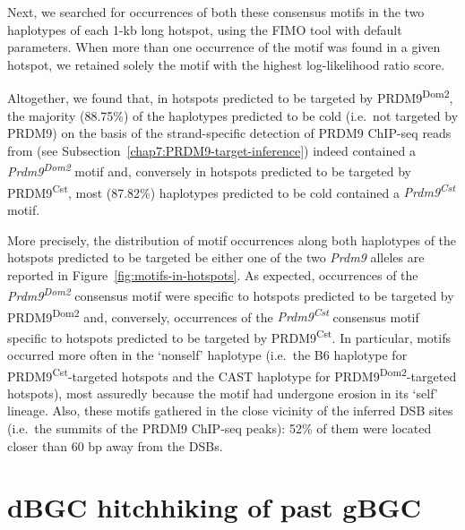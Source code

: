 Next, we searched for occurrences of both these consensus motifs in the two haplotypes of each 1-kb long hotspot, using the FIMO tool \citep{grant2011fimo} with default parameters. 
When more than one occurrence of the motif was found in a given hotspot, we retained solely the motif with the highest log-likelihood ratio score.

Altogether, we found that, in hotspots predicted to be targeted by PRDM9\textsuperscript{Dom2}, the majority (88.75\%) of the haplotypes predicted to be cold (i.e.\ not targeted by PRDM9) on the basis of the strand-specific detection of PRDM9 ChIP-seq reads from \citet{baker2015prdm9} (see Subsection~\ref{chap7:PRDM9-target-inference}) indeed contained a \textit{Prdm9\textsuperscript{Dom2}} motif and, conversely in hotspots predicted to be targeted by PRDM9\textsuperscript{Cst}, most (87.82\%) haplotypes predicted to be cold contained a \textit{Prdm9\textsuperscript{Cst}} motif.

More precisely, the distribution of motif occurrences along both haplotypes of the hotspots predicted to be targeted be either one of the two \textit{Prdm9} alleles are reported in Figure~\ref{fig:motifs-in-hotspots}.
As expected, occurrences of the \textit{Prdm9\textsuperscript{Dom2}} consensus motif were specific to hotspots predicted to be targeted by PRDM9\textsuperscript{Dom2} and, conversely, occurrences of the \textit{Prdm9\textsuperscript{Cst}} consensus motif specific to hotspots predicted to be targeted by PRDM9\textsuperscript{Cst}.
In particular, motifs occurred more often in the ‘nonself’ haplotype (i.e.\ the B6 haplotype for PRDM9\textsuperscript{Cst}-targeted hotspots and the CAST haplotype for PRDM9\textsuperscript{Dom2}-targeted hotspots), most assuredly because the motif had undergone erosion in its ‘self’ lineage.
Also, these motifs gathered in the close vicinity of the inferred DSB sites (i.e.\ the summits of the PRDM9 ChIP-seq peaks): 52\% of them were located closer than 60 bp away from the DSBs.





\section{dBGC hitchhiking of past gBGC}


